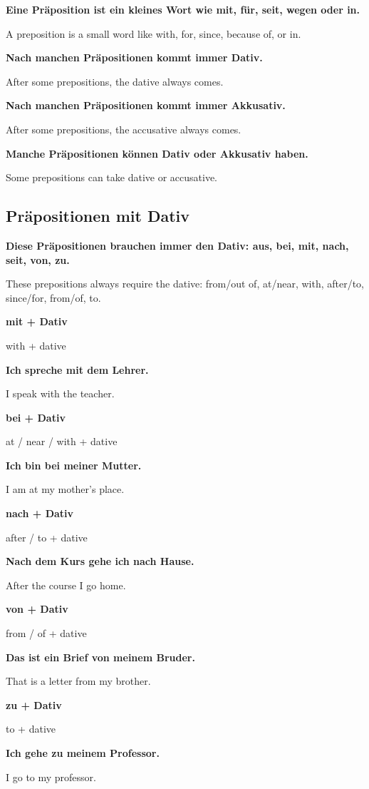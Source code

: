 \documentclass[a4paper]{article}
\newcommand{\EN}[1]{\par{\small\textcolor{TranslationGray}{#1}}\vspace{0.4em}}
\begin{document}
        \textbf{Eine Präposition ist ein kleines Wort wie mit, für, seit, wegen oder in.}
        \EN{A preposition is a small word like with, for, since, because of, or in.}
        
        \textbf{Nach manchen Präpositionen kommt immer Dativ.}
        \EN{After some prepositions, the dative always comes.}
        
        \textbf{Nach manchen Präpositionen kommt immer Akkusativ.}
        \EN{After some prepositions, the accusative always comes.}
        
        \textbf{Manche Präpositionen können Dativ oder Akkusativ haben.}
        \EN{Some prepositions can take dative or accusative.}
        
        \subsection{Präpositionen mit Dativ}
            
            \textbf{Diese Präpositionen brauchen immer den Dativ: aus, bei, mit, nach, seit, von, zu.}
            \EN{These prepositions always require the dative: from/out of, at/near, with, after/to, since/for, from/of, to.}
            
            \textbf{mit + Dativ}
            \EN{with + dative}
            
            \textbf{Ich spreche mit dem Lehrer.}
            \EN{I speak with the teacher.}
            
            \textbf{bei + Dativ}
            \EN{at / near / with + dative}
            
            \textbf{Ich bin bei meiner Mutter.}
            \EN{I am at my mother's place.}
            
            \textbf{nach + Dativ}
            \EN{after / to + dative}
            
            \textbf{Nach dem Kurs gehe ich nach Hause.}
            \EN{After the course I go home.}
            
            \textbf{von + Dativ}
            \EN{from / of + dative}
            
            \textbf{Das ist ein Brief von meinem Bruder.}
            \EN{That is a letter from my brother.}
            
            \textbf{zu + Dativ}
            \EN{to + dative}
            
            \textbf{Ich gehe zu meinem Professor.}
            \EN{I go to my professor.}
        
\end{document}
